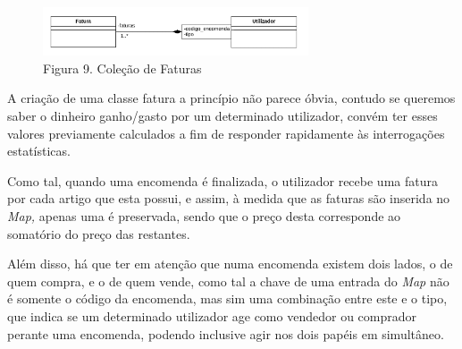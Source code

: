     \begin{figure}[hb!]
        \centering
        \vspace{-10pt}
        \includegraphics[width=0.7\textwidth]{imagens/12.png}
        \caption*{Figura 9. Coleção de Faturas}
    \end{figure}
    \vspace{8pt}

    A criação de uma classe fatura a princípio não parece óbvia, contudo se queremos saber o dinheiro ganho/gasto por um determinado utilizador, convém ter esses valores previamente calculados a fim de responder rapidamente às interrogações estatísticas.

    Como tal, quando uma encomenda é finalizada, o utilizador recebe uma fatura por cada artigo que esta possui, e assim, à medida que as faturas são inserida no \textit{Map,} apenas uma é preservada, sendo que o preço desta corresponde ao somatório do preço das restantes.

    Além disso, há que ter em atenção que numa encomenda existem dois lados, o de quem compra, e o de quem vende, como tal a chave de uma entrada do \textit{Map} não é somente o código da encomenda, mas sim uma combinação entre este e o tipo, que indica se um determinado utilizador age como vendedor ou comprador perante uma encomenda, podendo inclusive agir nos dois papéis em simultâneo.